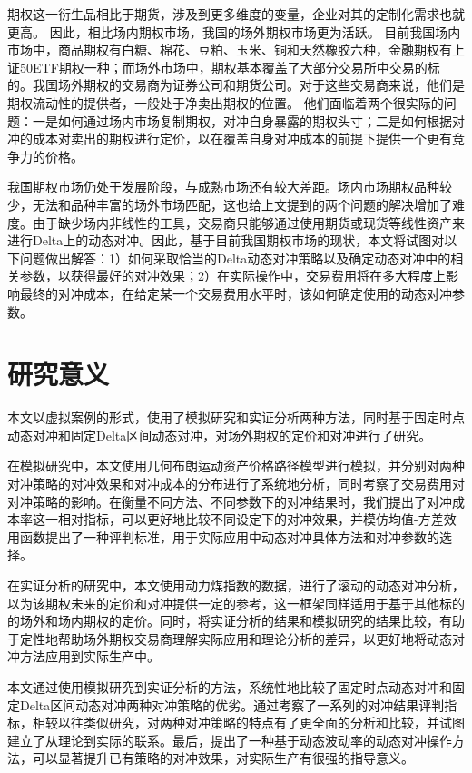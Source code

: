 期权这一衍生品相比于期货，涉及到更多维度的变量，企业对其的定制化需求也就更高。
因此，相比场内期权市场，我国的场外期权市场更为活跃。
目前我国场内市场中，商品期权有白糖、棉花、豆粕、玉米、铜和天然橡胶六种，金融期权有上证50ETF期权一种；而场外市场中，期权基本覆盖了大部分交易所中交易的标的。我国场外期权的交易商为证券公司和期货公司。对于这些交易商来说，他们是期权流动性的提供者，一般处于净卖出期权的位置。
他们面临着两个很实际的问题：一是如何通过场内市场复制期权，对冲自身暴露的期权头寸；二是如何根据对冲的成本对卖出的期权进行定价，以在覆盖自身对冲成本的前提下提供一个更有竞争力的价格。

我国期权市场仍处于发展阶段，与成熟市场还有较大差距。场内市场期权品种较少，无法和品种丰富的场外市场匹配，这也给上文提到的两个问题的解决增加了难度。由于缺少场内非线性的工具，交易商只能够通过使用期货或现货等线性资产来进行Delta上的动态对冲。因此，基于目前我国期权市场的现状，本文将试图对以下问题做出解答：1）如何采取恰当的Delta动态对冲策略以及确定动态对冲中的相关参数，以获得最好的对冲效果；2）在实际操作中，交易费用将在多大程度上影响最终的对冲成本，在给定某一个交易费用水平时，该如何确定使用的动态对冲参数。

\section{研究意义}

本文以虚拟案例的形式，使用了模拟研究和实证分析两种方法，同时基于固定时点动态对冲和固定Delta区间动态对冲，对场外期权的定价和对冲进行了研究。

在模拟研究中，本文使用几何布朗运动资产价格路径模型进行模拟，并分别对两种对冲策略的对冲效果和对冲成本的分布进行了系统地分析，同时考察了交易费用对对冲策略的影响。在衡量不同方法、不同参数下的对冲结果时，我们提出了对冲成本率这一相对指标，可以更好地比较不同设定下的对冲效果，并模仿均值-方差效用函数提出了一种评判标准，用于实际应用中动态对冲具体方法和对冲参数的选择。

在实证分析的研究中，本文使用动力煤指数的数据，进行了滚动的动态对冲分析，以为该期权未来的定价和对冲提供一定的参考，这一框架同样适用于基于其他标的的场外和场内期权的定价。同时，将实证分析的结果和模拟研究的结果比较，有助于定性地帮助场外期权交易商理解实际应用和理论分析的差异，以更好地将动态对冲方法应用到实际生产中。

本文通过使用模拟研究到实证分析的方法，系统性地比较了固定时点动态对冲和固定Delta区间动态对冲两种对冲策略的优劣。通过考察了一系列的对冲结果评判指标，相较以往类似研究，对两种对冲策略的特点有了更全面的分析和比较，并试图建立了从理论到实际的联系。最后，提出了一种基于动态波动率的动态对冲操作方法，可以显著提升已有策略的对冲效果，对实际生产有很强的指导意义。

